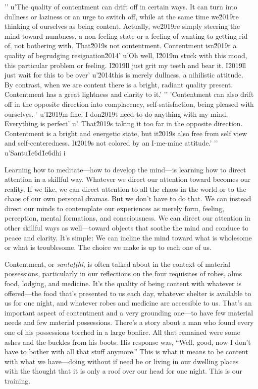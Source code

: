 '\n'
u'The quality of contentment can drift off in certain ways. It can turn into dullness or laziness or an urge to switch off, while at the same time we\u2019re thinking of ourselves as being content. Actually, we\u2019re simply steering the mind toward numbness, a non-feeling state or a feeling of wanting to getting rid of, not bothering with. That\u2019s not contentment. Contentment isn\u2019t a quality of begrudging resignation\u2014'
u'Oh well, I\u2019m stuck with this mood, this particular problem or feeling. I\u2019ll just grit my teeth and bear it. I\u2019ll just wait for this to be over'
u'\u2014this is merely dullness, a nihilistic attitude. By contrast, when we are content there is a bright, radiant quality present. Contentment has a great lightness and clarity to it.'
'\n'
'Contentment can also drift off in the opposite direction into complacency, self-satisfaction, being pleased with ourselves. '
u'I\u2019m fine. I don\u2019t need to do anything with my mind. Everything is perfect'
u'. That\u2019s taking it too far in the opposite direction. Contentment is a bright and energetic state, but it\u2019s also free from self view and self-centeredness. It\u2019s not colored by an I-me-mine attitude.'
'\n'
u'Santu\u1e6d\u1e6dhi i

Learning how to meditate---how to develop the mind---is learning how to 
direct attention in a skillful way. Whatever we direct our attention 
toward becomes our reality. If we like, we can direct attention to all 
the chaos in the world or to the chaos of our own personal dramas. But 
we don't have to do that. We can instead direct our minds to 
contemplate our experiences as merely form, feeling, perception, mental 
formations, and consciousness. We can direct our attention in other 
skillful ways as well---toward objects that soothe the mind and conduce 
to peace and clarity. It's simple: We can incline the mind toward what 
is wholesome or what is troublesome. The choice we make is up to each 
one of us.


Contentment, or \emph{santuṭṭhi}, is often talked about in the 
context of material possessions, particularly in our reflections on the 
four requisites of robes, alms food, lodging, and medicine. It's the 
quality of being content with whatever is offered---the food that's 
presented to us each day, whatever shelter is available to us for one 
night, and whatever robes and medicine are accessible to us. That's an 
important aspect of contentment and a very grounding one---to have few 
material needs and few material possessions. There's a story about a 
man who found every one of his possessions torched in a large bonfire. 
All that remained were some ashes and the buckles from his boots. His 
response was, ``Well, good, now I don't have to bother with all that 
stuff anymore.'' This is what it means to be content with what we 
have---doing without if need be or living in our dwelling places with 
the thought that it is only a roof over our head for one night. This is 
our training.


